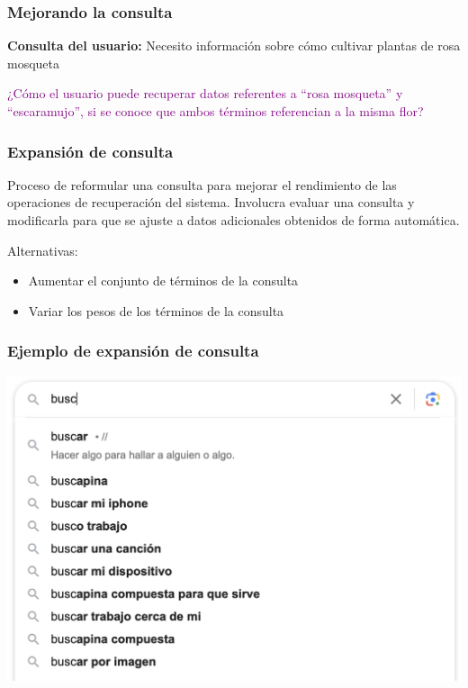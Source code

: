 \documentclass[
10pt, %
aspectratio=169, %
]{beamer}
\begin{document}
	\begin{frame}
		
		\frametitle{Mejorando la consulta}
		
		\textbf{Consulta del usuario:} Necesito información sobre cómo cultivar plantas de rosa mosqueta 
		
		\vspace{4\baselineskip}
				
		\textcolor{purple}{¿Cómo el usuario puede recuperar datos referentes a ``rosa mosqueta'' y ``escaramujo'', si se conoce que ambos términos referencian a la misma flor?}		
		
	\end{frame}
	
	\begin{frame}
		
		\frametitle{Expansión de consulta}
		
		\begin{alertblock}{}
			Proceso de reformular una consulta para mejorar el rendimiento de las operaciones de recuperación del sistema. Involucra evaluar una consulta y modificarla para que se ajuste a datos adicionales obtenidos de forma automática.
		\end{alertblock}
		
		\vspace{2\baselineskip}
		
		Alternativas: 
		\begin{itemize}
			\item Aumentar el conjunto de términos de la consulta
			\item Variar los pesos de los términos de la consulta			
		\end{itemize}		
		
	\end{frame}
	
	\begin{frame}
		
		\frametitle{Ejemplo de expansión de consulta}
		
		\centering
		\includegraphics[scale=0.5]{expansion.png}
		
	\end{frame}
	
\end{document}
